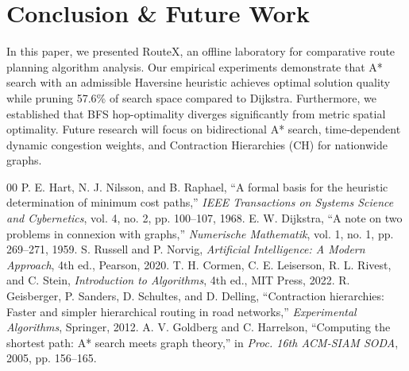 \documentclass[conference]{IEEEtran}
\begin{document}
\section{Conclusion \& Future Work}
In this paper, we presented RouteX, an offline laboratory for comparative route planning algorithm analysis. Our empirical experiments demonstrate that A* search with an admissible Haversine heuristic achieves optimal solution quality while pruning 57.6\% of search space compared to Dijkstra. Furthermore, we established that BFS hop-optimality diverges significantly from metric spatial optimality. Future research will focus on bidirectional A* search, time-dependent dynamic congestion weights, and Contraction Hierarchies (CH) for nationwide graphs.

\begin{thebibliography}{00}
 P. E. Hart, N. J. Nilsson, and B. Raphael, ``A formal basis for the heuristic determination of minimum cost paths,'' \textit{IEEE Transactions on Systems Science and Cybernetics}, vol. 4, no. 2, pp. 100--107, 1968.
 E. W. Dijkstra, ``A note on two problems in connexion with graphs,'' \textit{Numerische Mathematik}, vol. 1, no. 1, pp. 269--271, 1959.
 S. Russell and P. Norvig, \textit{Artificial Intelligence: A Modern Approach}, 4th ed., Pearson, 2020.
 T. H. Cormen, C. E. Leiserson, R. L. Rivest, and C. Stein, \textit{Introduction to Algorithms}, 4th ed., MIT Press, 2022.
 R. Geisberger, P. Sanders, D. Schultes, and D. Delling, ``Contraction hierarchies: Faster and simpler hierarchical routing in road networks,'' \textit{Experimental Algorithms}, Springer, 2012.
 A. V. Goldberg and C. Harrelson, ``Computing the shortest path: A* search meets graph theory,'' in \textit{Proc. 16th ACM-SIAM SODA}, 2005, pp. 156--165.
\end{thebibliography}
\end{document}
